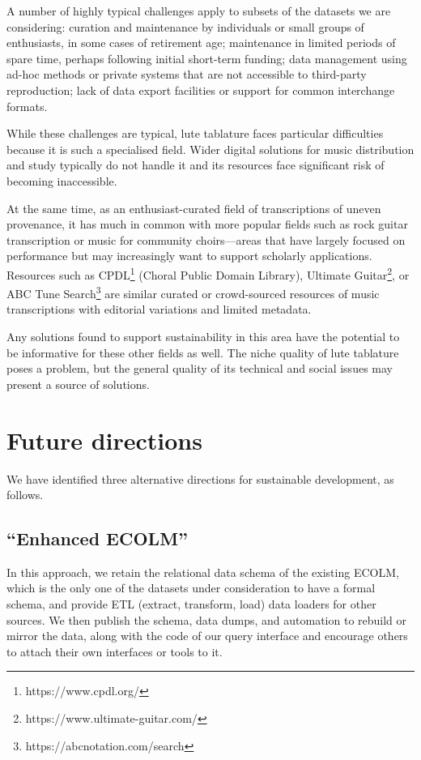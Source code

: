 \documentclass[sigconf]{acmart}
\begin{document}
\begin{sloppypar}
  A number of highly typical challenges apply to subsets of the
  datasets we are considering: curation and maintenance by individuals
  or small groups of enthusiasts, in some cases of retirement age;
  maintenance in limited periods of spare time, perhaps following
  initial short-term funding; data management using ad-hoc methods or
  private systems that are not accessible to third-party reproduction;
  lack of data export facilities or support for common interchange
  formats.

  While these challenges are typical, lute tablature faces particular
  difficulties because it is such a specialised field. Wider digital
  solutions for music distribution and study typically do not handle
  it and its resources face significant risk of becoming inaccessible.

  At the same time, as an enthusiast-curated field of transcriptions
  of uneven provenance, it has much in common with more popular fields
  such as rock guitar transcription or music for community
  choirs---areas that have largely focused on performance but may
  increasingly want to support scholarly applications. Resources such
  as CPDL\footnote{https://www.cpdl.org/} (Choral Public Domain
  Library), Ultimate
  Guitar\footnote{https://www.ultimate-guitar.com/}, or ABC Tune
  Search\footnote{https://abcnotation.com/search} are similar curated
  or crowd-sourced resources of music transcriptions with editorial
  variations and limited metadata.

  Any solutions found to support sustainability in this area have the
  potential to be informative for these other fields as well. The
  niche quality of lute tablature poses a problem, but the general
  quality of its technical and social issues may present a source of
  solutions.
  
  \section{Future directions}

  We have identified three alternative directions for sustainable
  development, as follows.
  
  \subsection{``Enhanced ECOLM''}

  In this approach, we retain the relational data schema of the
  existing ECOLM, which is the only one of the datasets under
  consideration to have a formal schema, and provide ETL (extract,
  transform, load) data loaders for other sources. We then publish the
  schema, data dumps, and automation to rebuild or mirror the data,
  along with the code of our query interface and encourage others to
  attach their own interfaces or tools to it.


\end{sloppypar}
\end{document}

